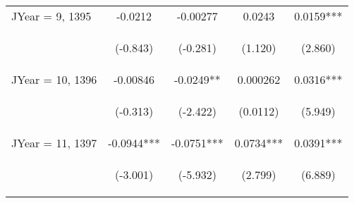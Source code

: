 \documentclass[]{standalone}
\begin{document}
\begin{tabular}{lcccc}
    JYear = 9, 1395  & -0.0212                                        & -0.00277                                       & 0.0243                                         & 0.0159***                                      \\
    \vspace{4pt}     & \begin{footnotesize}(-0.843)\end{footnotesize} & \begin{footnotesize}(-0.281)\end{footnotesize} & \begin{footnotesize}(1.120)\end{footnotesize}  & \begin{footnotesize}(2.860)\end{footnotesize}  \\
    JYear = 10, 1396 & -0.00846                                       & -0.0249**                                      & 0.000262                                       & 0.0316***                                      \\
    \vspace{4pt}     & \begin{footnotesize}(-0.313)\end{footnotesize} & \begin{footnotesize}(-2.422)\end{footnotesize} & \begin{footnotesize}(0.0112)\end{footnotesize} & \begin{footnotesize}(5.949)\end{footnotesize}  \\
    JYear = 11, 1397 & -0.0944***                                     & -0.0751***                                     & 0.0734***                                      & 0.0391***                                      \\
    \vspace{4pt}     & \begin{footnotesize}(-3.001)\end{footnotesize} & \begin{footnotesize}(-5.932)\end{footnotesize} & \begin{footnotesize}(2.799)\end{footnotesize}  & \begin{footnotesize}(6.889)\end{footnotesize}  \\

\end{tabular}
\end{document}
